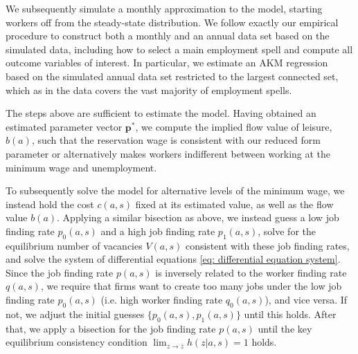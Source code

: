 We subsequently simulate a monthly approximation to the model, starting workers off from the steady-state distribution. We follow exactly our empirical procedure to construct both a monthly and an annual data set based on the simulated data, including how to select a main employment spell and compute all outcome variables of interest. In particular, we estimate an AKM regression based on the simulated annual data set restricted to the largest connected set, which as in the data covers the vast majority of employment spells.

The steps above are sufficient to estimate the model. Having obtained an estimated parameter vector $\mathbf{p}^\ast$, we compute the implied flow value of leisure, $b(a)$, such that the reservation wage is consistent with our reduced form parameter or alternatively makes workers indifferent between working at the minimum wage and unemployment.

To subsequently solve the model for alternative levels of the minimum wage, we instead hold the cost $c(a,s)$ fixed at its estimated value, as well as the flow value $b(a)$. Applying a similar bisection as above, we instead guess a low job finding rate $p_0(a,s)$ and a high job finding rate $p_1(a,s)$, solve for the equilibrium number of vacancies $V(a,s)$ consistent with these job finding rates, and solve the system of differential equations \eqref{eq: differential equation system}. Since the job finding rate $p(a,s)$ is inversely related to the worker finding rate $q(a,s)$, we require that firms want to create too many jobs under the low job finding rate $p_0(a,s)$ (i.e. high worker finding rate $q_0(a,s)$), and vice versa. If not, we adjust the initial guesses $\{p_0(a,s),p_1(a,s)\}$ until this holds. After that, we apply a bisection for the job finding rate $p(a,s)$ until the key equilibrium consistency condition $\lim_{z\to\overline{z}} h(z|a,s) = 1$ holds.
